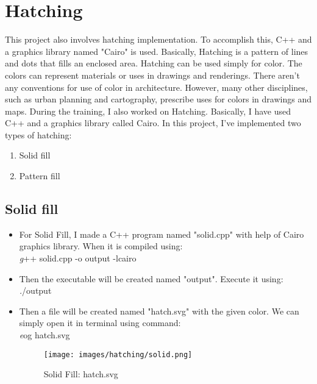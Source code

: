 \newpage
\section{Hatching}
This project also involves hatching implementation. To accomplish this, C++ and a graphics library named "Cairo" is used.
Basically, Hatching is a pattern of lines and dots that fills an enclosed area. Hatching can be used simply for color. The colors can represent materials or uses in drawings and renderings. There aren't any conventions for use of color in architecture. However, many other disciplines, such as urban planning and cartography, prescribe uses for colors in drawings and maps.
\noindent During the training, I also worked on Hatching. Basically, I have used C++ and a graphics library called Cairo. 
In this project, I've implemented two types of hatching:
\begin{enumerate}
\item Solid fill
\item Pattern fill
\end{enumerate}
\subsection{Solid fill}
\begin{itemize}
\item For Solid Fill, I made a C++ program named "solid.cpp" with help of Cairo graphics library. When it is compiled using:\\
\textit g++ solid.cpp -o output -lcairo
\item Then the executable will be created named "output". Execute it using:\\
\textit ./output
\item Then a file will be created named "hatch.svg" with the given color.
We can simply open it in terminal using command:\\
\textit eog hatch.svg
\begin{figure}[!ht]
\centering
\texttt{[image: images/hatching/solid.png]}                   
\vspace{-1em}
\caption{Solid Fill: hatch.svg}
\hspace{-1.5em}
\end{figure}
\end{itemize}

